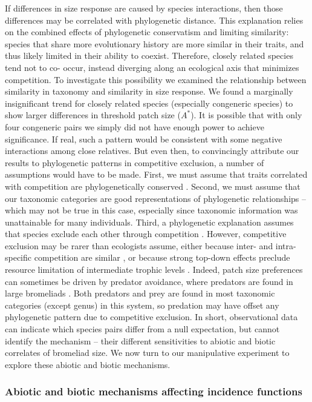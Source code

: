 If differences in size response are caused by species interactions, then
those differences may be correlated with phylogenetic distance. This
explanation relies on the combined effects of phylogenetic conservatism
and limiting similarity: species that share more evolutionary history
are more similar in their traits, and thus likely limited in their
ability to coexist. Therefore, closely related species tend not to co-
occur, instead diverging along an ecological axis that minimizes
competition. To investigate this possibility we examined the
relationship between similarity in taxonomy and similarity in size
response. We found a marginally insignificant trend for closely related
species (especially congeneric species) to show larger differences in
threshold patch size (\(A^{*}\)). It is possible that with only four
congeneric pairs we simply did not have enough power to achieve
significance. If real, such a pattern would be consistent with some
negative interactions among close relatives. But even then, to
convincingly attribute our results to phylogenetic patterns in
competitive exclusion, a number of assumptions would have to be made.
First, we must assume that traits correlated with competition are
phylogenetically conserved \citep{Swenson2011}. Second, we must assume
that our taxonomic categories are good representations of phylogenetic
relationships -- which may not be true in this case, especially since
taxonomic information was unattainable for many individuals. Third, a
phylogenetic explanation assumes that species exclude each other through
competition \citep{Narwani2015}. However, competitive exclusion may be
rarer than ecologists assume, either because inter- and intra-specific
competition are similar \citep{Hubbell1997}, or because strong top-down
effects preclude resource limitation of intermediate trophic levels
\citep{Holt2004}. Indeed, patch size preferences can sometimes be
driven by predator avoidance, where predators are found in large
bromeliads \citep{Hammill2015}. Both predators and prey are found in
most taxonomic categories (except genus) in this system, so predation
may have offset any phylogenetic pattern due to competitive exclusion.
In short, observational data can indicate which species pairs differ
from a null expectation, but cannot identify the mechanism -- their
different sensitivities to abiotic and biotic correlates of bromeliad
size. We now turn to our manipulative experiment to explore these
abiotic and biotic mechanisms.

\subsubsection{Abiotic and biotic mechanisms affecting incidence
functions}\label{abiotic-and-biotic-mechanisms-affecting-incidence-functions}

